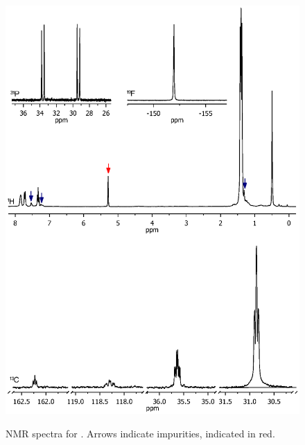 \begin{figure}[htbp] 
\begin{center}
\vspace{0.5cm}
\includegraphics[trim = 2.3cm 2.2cm 2cm 5cm, clip]{../NMR/SitBuAgBF4_2.eps}
\caption[NMR spectra for {[}Ag(tBu-sixantphos){]BF4}]{NMR spectra for .  Arrows indicate impurities,  indicated in red.}
\vspace{0.2cm}
\label{NMRAgBF4}
\end{center}
\end{figure}
\vspace{0.2cm}


